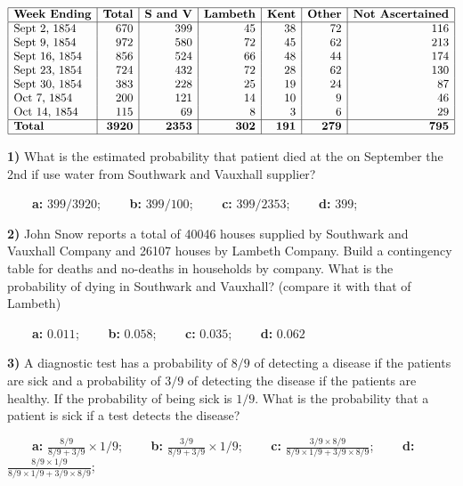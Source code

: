 \documentclass[
]{book}
\begin{document}
\[
\begin{array}{|l|r|r|r|r|r|r|}
\hline
\textbf{Week Ending} & \textbf{Total} & \textbf{S and V} & \textbf{Lambeth} & \textbf{Kent} & \textbf{Other} & \textbf{Not Ascertained} \\
\hline
\text{Sept 2, 1854}  & 670 & 399 & 45  & 38  & 72 & 116 \\
\text{Sept 9, 1854}  & 972 & 580 & 72  & 45  & 62 & 213 \\
\text{Sept 16, 1854} & 856 & 524 & 66  & 48  & 44 & 174 \\
\text{Sept 23, 1854} & 724 & 432 & 72  & 28  & 62 & 130 \\
\text{Sept 30, 1854} & 383 & 228 & 25  & 19  & 24 &  87 \\
\text{Oct 7, 1854}   & 200 & 121 & 14  & 10  & 9  &  46 \\
\text{Oct 14, 1854}  & 115 &  69 & 8   & 3   & 6  &  29 \\
\hline
\textbf{Total}       & \textbf{3920} & \textbf{2353} & \textbf{302} & \textbf{191} & \textbf{279} & \textbf{795} \\
\hline
\end{array}
\]

\textbf{1)} What is the estimated probability that patient died at the on September the 2nd if use water from Southwark and Vauxhall supplier?

\textbf{\(\qquad\)a:} \(399/3920\); \textbf{\(\qquad\)b:} \(399/100\); \textbf{\(\qquad\)c:} \(399/2353\); \textbf{\(\qquad\)d:} \(399\);

\textbf{2)} John Snow reports a total of 40046 houses supplied by Southwark and Vauxhall Company and 26107 houses by Lambeth Company. Build a contingency table for deaths and no-deaths in households by company. What is the probability of dying in Southwark and Vauxhall? (compare it with that of Lambeth)

\textbf{\(\qquad\)a:} \(0.011\); \textbf{\(\qquad\)b:} \(0.058\); \textbf{\(\qquad\)c:} \(0.035\); \textbf{\(\qquad\)d:} \(0.062\)

\textbf{3)} A diagnostic test has a probability of \(8/9\) of detecting a disease if the patients are sick and a probability of \(3/9\) of detecting the disease if the patients are healthy. If the probability of being sick is \(1/9\). What is the probability that a patient is sick if a test detects the disease?

\textbf{\(\qquad\)a:} \(\frac{8/9}{8/9+3/9}\times1/9\);
\textbf{\(\qquad\)b:} \(\frac{3/9}{8/9+3/9}\times1/9\);
\textbf{\(\qquad\)c:} \(\frac{3/9\times8/9}{8/9\times1/9+3/9\times8/9}\); \textbf{\(\qquad\)d:} \(\frac{8/9\times1/9}{8/9\times1/9+3/9\times8/9}\);
\end{document}
